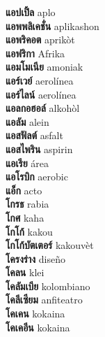 \textbf{ แอปเปิ้ล  } aplo \\
\textbf{ แอพพลิเคชั่น  } aplikashon \\
\textbf{ แอพริคอต  } aprikòt \\
\textbf{ แอฟริกา  } Afrika \\
\textbf{ แอมโมเนีย  } amoniak \\
\textbf{ แอร์เวย์  } aerolínea \\
\textbf{ แอร์ไลน์  } aerolínea \\
\textbf{ แอลกอฮอล์  } alkohòl \\
\textbf{ แอลัม  } alein \\
\textbf{ แอสฟัลต์  } asfalt \\
\textbf{ แอสไพริน  } aspirin \\
\textbf{ แอเรีย  } área \\
\textbf{ แอโรบิก  } aerobic \\
\textbf{ แอ็ก  } acto \\
\textbf{ โกรธ  } rabia \\
\textbf{ โกศ  } kaha \\
\textbf{ โกโก้  } kakou \\
\textbf{ โกโก้บัตเตอร์  } kakouvèt \\
\textbf{ โครงร่าง  } diseño \\
\textbf{ โคลน  } klei \\
\textbf{ โคลัมเบีย  } kolombiano \\
\textbf{ โคลีเซียม  } anfiteatro \\
\textbf{ โคเคน  } kokaina \\
\textbf{ โคเคอีน  } kokaina \\
